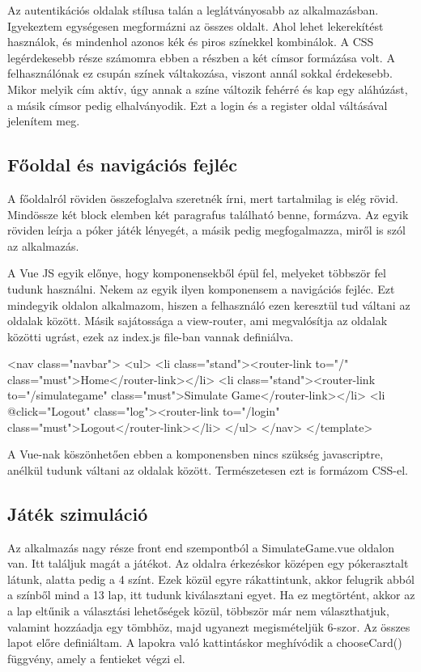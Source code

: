 Az autentikációs oldalak stílusa talán a leglátványosabb az alkalmazásban. Igyekeztem egységesen megformázni az összes oldalt. Ahol lehet lekerekítést használok, és mindenhol azonos kék és piros színekkel kombinálok. A CSS legérdekesebb része számomra ebben a részben a két címsor formázása volt. A felhasználónak ez csupán színek váltakozása, viszont annál sokkal érdekesebb. Mikor melyik cím aktív, úgy annak a színe változik fehérré és kap egy aláhúzást, a másik címsor pedig elhalványodik. Ezt a login és a register oldal váltásával jelenítem meg.


\subsection{Főoldal és navigációs fejléc}
A főoldalról röviden összefoglalva szeretnék írni, mert tartalmilag is elég rövid. Mindössze két block elemben két paragrafus található benne, formázva. Az egyik röviden leírja a póker játék lényegét, a másik pedig megfogalmazza, miről is szól az alkalmazás.

A Vue JS egyik előnye, hogy komponensekből épül fel, melyeket többször fel tudunk használni. Nekem az egyik ilyen komponensem a navigációs fejléc. Ezt mindegyik oldalon alkalmazom, hiszen a felhasználó ezen keresztül tud váltani az oldalak között. Másik sajátossága a view-router, ami megvalósítja az oldalak közötti ugrást, ezek az index.js file-ban vannak definiálva.

\begin{python}
<nav class="navbar">
  <ul>
    <li class="stand"><router-link to="/" class="must">Home</router-link></li>
    <li class="stand"><router-link to="/simulategame" class="must">Simulate Game</router-link></li>
    <li @click="Logout" class="log"><router-link to="/login" class="must">Logout</router-link></li>
  </ul>
</nav>
</template>
\end{python}

A Vue-nak köszönhetően ebben a komponensben nincs szükség javascriptre, anélkül tudunk váltani az oldalak között. Természetesen ezt is formázom CSS-el.

\subsection{Játék szimuláció}
Az alkalmazás nagy része front end szempontból a SimulateGame.vue oldalon van. Itt találjuk magát a játékot. Az oldalra érkezéskor középen egy pókerasztalt látunk, alatta pedig a 4 színt. Ezek közül egyre rákattintunk, akkor felugrik abból a színből mind a 13 lap, itt tudunk kiválasztani egyet. Ha ez megtörtént, akkor az a lap eltűnik a választási lehetőségek közül, többször már nem választhatjuk, valamint hozzáadja egy tömbhöz, majd ugyanezt megismételjük 6-szor. Az összes lapot előre definiáltam. A lapokra való kattintáskor meghívódik a chooseCard() függvény, amely a fentieket végzi el.

